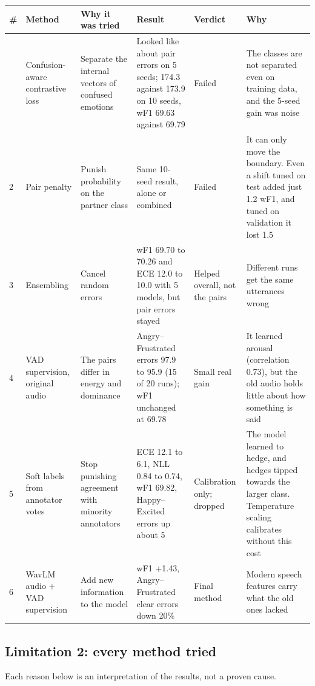 \documentclass[11pt,a4paper]{article}
\newcommand{\mn}{\textminus}
\begin{document}
{\footnotesize
\begin{longtable}{L{0.4cm}L{2.4cm}L{2.6cm}L{3.9cm}L{1.8cm}L{3.9cm}}
\toprule
\# & Method & Why it was tried & Result & Verdict & Why \\
\midrule
\endhead
\bottomrule
{} & Confusion-aware contrastive loss & Separate the internal vectors of confused emotions & Looked like about \mn15 pair errors on 5 seeds; 174.3 against 173.9 on 10 seeds, wF1 69.63 against 69.79 & Failed & The classes are not separated even on training data, and the 5-seed gain was noise \\
2 & Pair penalty & Punish probability on the partner class & Same 10-seed result, alone or combined & Failed & It can only move the boundary. Even a shift tuned on test added just 1.2 wF1, and tuned on validation it lost 1.5 \\
3 & Ensembling & Cancel random errors & wF1 69.70 to 70.26 and ECE 12.0 to 10.0 with 5 models, but pair errors stayed & Helped overall, not the pairs & Different runs get the same utterances wrong \\
4 & VAD supervision, original audio & The pairs differ in energy and dominance & Angry--Frustrated errors 97.9 to 95.9 (15 of 20 runs); wF1 unchanged at 69.78 & Small real gain & It learned arousal (correlation 0.73), but the old audio holds little about how something is said \\
5 & Soft labels from annotator votes & Stop punishing agreement with minority annotators & ECE 12.1 to 6.1, NLL 0.84 to 0.74, wF1 69.82, Happy--Excited errors up about 5 & Calibration only; dropped & The model learned to hedge, and hedges tipped towards the larger class. Temperature scaling calibrates without this cost \\
6 & WavLM audio + VAD supervision & Add new information to the model & wF1 +1.43, Angry--Frustrated clear errors down 20\% & Final method & Modern speech features carry what the old ones lacked \\
\end{longtable}
}

\subsection{Limitation 2: every method tried}
\label{sec:abl-l2}

Each reason below is an interpretation of the results, not a proven cause.
\end{document}
